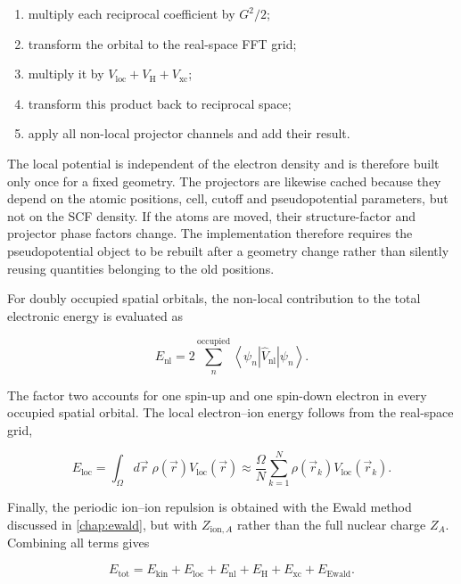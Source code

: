 \begin{enumerate}
    \item multiply each reciprocal coefficient by $G^{2}/2$;
    \item transform the orbital to the real-space FFT grid;
    \item multiply it by $V_{\text{loc}}+V_{\text{H}}+V_{\text{xc}}$;
    \item transform this product back to reciprocal space;
    \item apply all non-local projector channels and add their result.
\end{enumerate}

The local potential is independent of the electron density and is therefore built only once for a fixed geometry. The projectors are likewise cached because they depend on the atomic positions, cell, cutoff and pseudopotential parameters, but not on the SCF density. If the atoms are moved, their structure-factor and projector phase factors change. The implementation therefore requires the pseudopotential object to be rebuilt after a geometry change rather than silently reusing quantities belonging to the old positions.

For doubly occupied spatial orbitals, the non-local contribution to the total electronic energy is evaluated as

\begin{equation}
    E_{\text{nl}} = 2\sum_{n}^{\text{occupied}}
    \left<\psi_{n}\left|\hat{V}_{\text{nl}}\right|\psi_{n}\right>.
    \label{eq:gth-nonlocal-energy}
\end{equation}

The factor two accounts for one spin-up and one spin-down electron in every occupied spatial orbital. The local electron--ion energy follows from the real-space grid,

\begin{equation}
    E_{\text{loc}} = \int_{\Omega}d\vec{r}\;
    \rho(\vec{r})V_{\text{loc}}(\vec{r})
    \approx \frac{\Omega}{N}\sum_{k=1}^{N}
    \rho(\vec{r}_{k})V_{\text{loc}}(\vec{r}_{k}).
    \label{eq:gth-local-energy}
\end{equation}

Finally, the periodic ion--ion repulsion is obtained with the Ewald method discussed in \cref{chap:ewald}, but with $Z_{\text{ion},A}$ rather than the full nuclear charge $Z_{A}$. Combining all terms gives

\begin{equation}
    E_{\text{tot}} = E_{\text{kin}} + E_{\text{loc}} + E_{\text{nl}}
    + E_{\text{H}} + E_{\text{xc}} + E_{\text{Ewald}}.
    \label{eq:gth-total-energy}
\end{equation}

